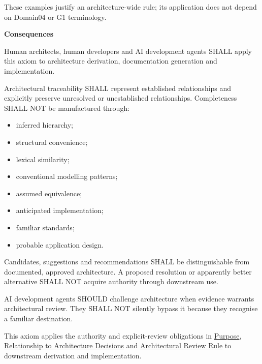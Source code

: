 These examples justify an architecture-wide rule; its application does
not depend on Domain04 or G1 terminology.



\par\medskip\textbf{Consequences}\par


Human architects, human developers and AI development agents SHALL apply
this axiom to architecture derivation, documentation generation and
implementation.



Architectural traceability SHALL represent established relationships and
explicitly preserve unresolved or unestablished relationships.
Completeness SHALL NOT be manufactured through:



\begin{itemize}


\item inferred hierarchy;

\item structural convenience;

\item lexical similarity;

\item conventional modelling patterns;

\item assumed equivalence;

\item anticipated implementation;

\item familiar standards;

\item probable application design.

\end{itemize}


Candidates, suggestions and recommendations SHALL be distinguishable from
documented, approved architecture. A proposed resolution or apparently
better alternative SHALL NOT acquire authority through downstream use.



AI development agents SHOULD challenge architecture when evidence
warrants architectural review. They SHALL NOT silently bypass it because
they recognise a familiar destination.



This axiom applies the authority and explicit-review obligations in
\href{\detokenize{../../../../governance/architectural-axioms.md#1-purpose}}{Purpose}, \href{\detokenize{../../../../governance/architectural-axioms.md#6-relationship-to-architecture-decisions}}{Relationship to Architecture Decisions}
and \href{\detokenize{../../../../governance/architectural-axioms.md#7-architectural-review-rule}}{Architectural Review Rule} to downstream
derivation and implementation.



